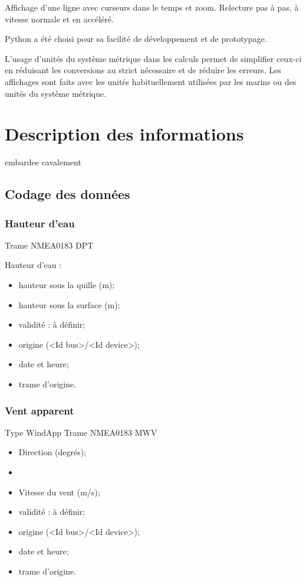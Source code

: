 \documentclass[a4paper,11pt]{report}
\begin{document}
Affichage d'une ligne avec curseurs dans le temps et zoom.
Relecture pas à pas, à vitesse normale et en accéléré.

Python a été choisi pour sa facilité de développement et de prototypage.

L'usage d'unités du système métrique dans les calculs permet
de simplifier ceux-ci en réduisant les conversions au strict nécessaire
et de réduire les erreurs. Les affichages sont faits avec les unités habituellement
utilisées par les marins ou des unités du système métrique.

\chapter{Description des informations}
\gls{embardee}
\gls{cavalement}

\section{Codage des données}\label{datacoding}
\subsection{Hauteur d'eau}\label{datacoding}
Trame NMEA0183 DPT

Hauteur d'eau :
\begin{itemize}
	\item hauteur sous la quille (m);
	\item hauteur sous la surface (m);
	\item validité : à définir;
	\item origine (<Id bus>/<Id device>);
	\item date et heure;
	\item trame d'origine.
\end{itemize}

\subsection{Vent apparent}\label{datacoding}
Type WindApp
Trame NMEA0183 MWV

\begin{itemize}
	\item Direction (degrés);
    \item 
	\item Vitesse du vent (m/s);
	
	\item validité : à définir;
	\item origine (<Id bus>/<Id device>);
	\item date et heure;
	\item trame d'origine.
\end{itemize}
\end{document}

